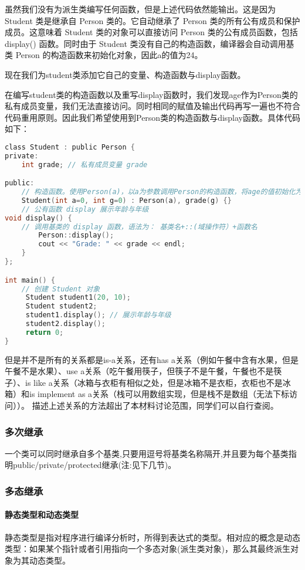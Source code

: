 \documentclass[UTF8]{ctexart}
\begin{document}
虽然我们没有为派生类编写任何函数，但是上述代码依然能输出。这是因为Student 类是继承自 Person 类的。它自动继承了 Person 类的所有公有成员和保护成员。这意味着 Student 类的对象可以直接访问 Person 类的公有成员函数，包括 display() 函数。同时由于 Student 类没有自己的构造函数，编译器会自动调用基类 Person 的构造函数来初始化对象，因此a的值为24。

现在我们为student类添加它自己的变量、构造函数与display函数。
    
在编写student类的构造函数以及重写display函数时，我们发现age作为Person类的私有成员变量，我们无法直接访问。同时相同的赋值及输出代码再写一遍也不符合代码重用原则。因此我们希望使用到Person类的构造函数与display函数。具体代码如下：
\begin{lstlisting}[language = C,basicstyle=\small\ttfamily]
class Student : public Person {
private:
    int grade; // 私有成员变量 grade

public:
    // 构造函数。使用Person(a)，以a为参数调用Person的构造函数，将age的值初始化为a
    Student(int a=0, int g=0) : Person(a), grade(g) {} 
    // 公有函数 display 展示年龄与年级
void display() {
    // 调用基类的 display 函数，语法为： 基类名+::(域操作符）+函数名
        Person::display(); 
        cout << "Grade: " << grade << endl;
    }
};

int main() {
    // 创建 Student 对象
     Student student1(20, 10);
     Student student2;
     student1.display(); // 展示年龄与年级
     student2.display();
     return 0;
}
\end{lstlisting}

但是并不是所有的关系都是is-a关系，还有has a关系（例如午餐中含有水果，但是午餐不是水果）、use a关系（吃午餐用筷子，但筷子不是午餐，午餐也不是筷子）、is like a关系（冰箱与衣柜有相似之处，但是冰箱不是衣柜，衣柜也不是冰箱）和is implement as a关系（栈可以用数组实现，但是栈不是数组（无法下标访问））。 描述上述关系的方法超出了本材料讨论范围，同学们可以自行查阅。

\subsubsection{多次继承}
一个类可以同时继承自多个基类,只要用逗号将基类名称隔开,并且要为每个基类指明public/private/protected继承(注:见下几节)。

\subsubsection{多态继承}
\paragraph{静态类型和动态类型}静态类型是指对程序进行编译分析时，所得到表达式的类型。相对应的概念是动态类型：如果某个指针或者引用指向一个多态对象(派生类对象)，那么其最终派生对象为其动态类型。
\end{document}
